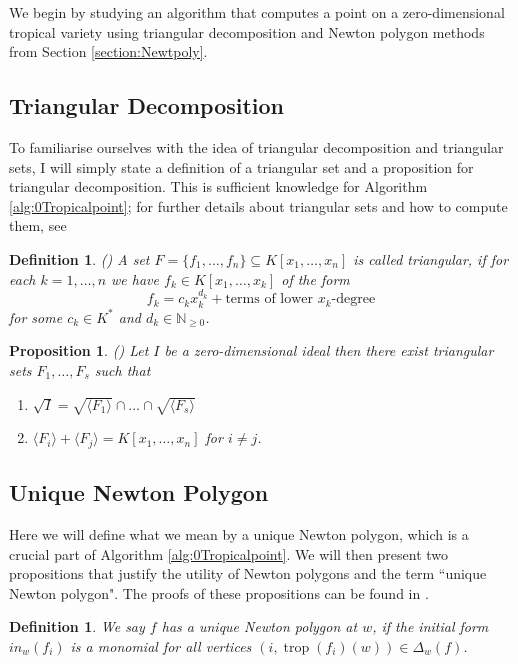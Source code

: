 \documentclass[11pt,reqno,a4paper]{article}
\theoremstyle{theoremstyle}
\newtheorem{proposition}[theorem]{Proposition}
\theoremstyle{examplestyle}
\newtheorem{definition}[theorem]{Definition}
\theoremstyle{algorithmstyle}
\numberwithin{equation}{subsection}
\newcommand{\NN}{\mathbb{N}}
\DeclareMathOperator{\trop}{trop}
\begin{document}
We begin by studying an algorithm \cite[Algorithm 2.10]{HR2018} that computes a point on a zero-dimensional tropical variety using triangular decomposition and Newton polygon methods from Section \ref{section:Newtpoly}.

\subsection{Triangular Decomposition}
To familiarise ourselves with the idea of triangular decomposition and triangular sets, I will simply state a definition of a triangular set and a proposition for triangular decomposition. This is sufficient knowledge for Algorithm \ref{alg:0Tropicalpoint}; for further details about triangular sets and how to compute them, see \cite[Chap. 4.7]{GP2007}

\begin{definition} 
    (\cite[Def. 2.3]{HR2018}) A set $F = \{f_1,\ldots, f_n\} \subseteq K[x_1,\ldots,x_n]$ is called \textit{triangular}, if for each $k = 1,\ldots , n$ we have $f_k \in K[x_1,\ldots, x_k]$ of the form \[f_k = c_kx_k^{d_k} + \text{terms of lower } x_k \text{-degree}\] for some $c_k\in K^*$ and $d_k \in \NN_{\geq0}$.
\end{definition}

\begin{proposition}
    (\cite[Cor. 4.7.4]{GP2007}) Let $I$ be a zero-dimensional ideal then there exist triangular sets $F_1,\ldots,F_s$ such that
    \begin{enumerate}[label = \textit{(\arabic*)}, left = 0pt]
        \item $\sqrt{I} = \sqrt{\langle F_1 \rangle} \cap \ldots \cap \sqrt{\langle F_s \rangle}$
        \item $\langle F_i \rangle + \langle F_j \rangle = K[x_1, \ldots, x_n]$ for $i \neq j$.
    \end{enumerate}
\end{proposition}

\subsection{Unique Newton Polygon}
Here we will define what we mean by a unique Newton polygon, which is a crucial part of Algorithm \ref{alg:0Tropicalpoint}. We will then present two propositions that justify the utility of Newton polygons and the term ``unique Newton polygon". The proofs of these propositions can be found in \cite{HR2018}.

\begin{definition}
    We say $f$ has a \textit{unique Newton polygon} at $w$, if the initial form $in_w(f_i)$ is a monomial for all vertices $\left(i,\trop(f_i)(w)\right) \in \Delta_w(f)$. 
\end{definition}
\end{document}
